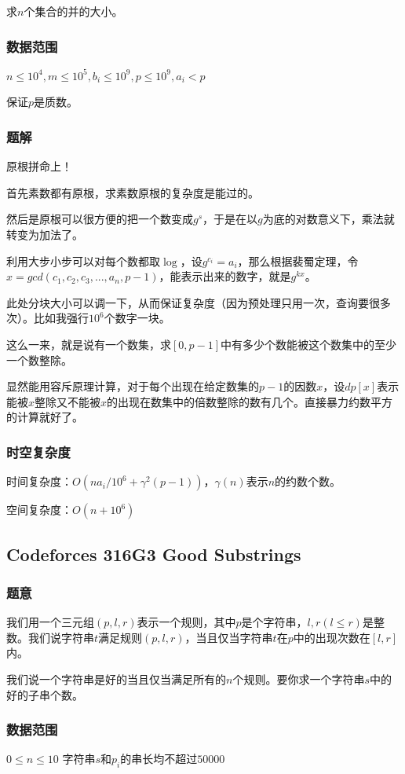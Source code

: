 \documentclass{ctexart}
\begin{document}
求$n$个集合的并的大小。
\subsubsection{数据范围}
$n \le 10^4,m \le 10^5,b_i \le 10^9,p \le 10^9,a_i < p$

保证$p$是质数。
\subsubsection{题解}
原根拼命上！

首先素数都有原根，求素数原根的复杂度是能过的。

然后是原根可以很方便的把一个数变成$g^s$，于是在以$g$为底的对数意义下，乘法就转变为加法了。

利用大步小步可以对每个数都取$\log$，设$g^{c_i}=a_i$，那么根据裴蜀定理，令$x=gcd(c_1,c_2,c_3,...,a_n,p-1)$，能表示出来的数字，就是$g^{kx}$。

此处分块大小可以调一下，从而保证复杂度（因为预处理只用一次，查询要很多次）。比如我强行$10^6$个数字一块。

这么一来，就是说有一个数集，求$[0,p-1]$中有多少个数能被这个数集中的至少一个数整除。

显然能用容斥原理计算，对于每个出现在给定数集的$p-1$的因数$x$，设$dp[x]$表示能被$x$整除又不能被$x$的出现在数集中的倍数整除的数有几个。直接暴力约数平方的计算就好了。
\subsubsection{时空复杂度}
时间复杂度：$O(na_i/10^6+\gamma^2(p-1))$，$\gamma(n)$表示$n$的约数个数。

空间复杂度：$O(n+10^6)$
\subsection{Codeforces 316G3 Good Substrings}
\subsubsection{题意}
我们用一个三元组$(p,l,r)$表示一个规则，其中$p$是个字符串，$l,r(l \le r)$是整数。我们说字符串$t$满足规则$(p,l,r)$，当且仅当字符串$t$在$p$中的出现次数在$[l,r]$内。

我们说一个字符串是好的当且仅当满足所有的$n$个规则。要你求一个字符串$s$中的好的子串个数。
\subsubsection{数据范围}
$0 \le n \le 10$
字符串$s$和$p_i$的串长均不超过$50000$
\end{document}
